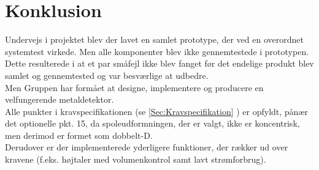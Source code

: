 \documentclass[../main.tex]{subfiles}
\begin{document}
\chapter{Konklusion} \label{Chap:Konklusion}
Undervejs i projektet blev der lavet en samlet prototype, der ved en overordnet systemtest virkede. Men alle komponenter blev ikke gennemtestede i prototypen. Dette resulterede i at et par småfejl ikke blev fanget før det endelige produkt blev samlet og gennemtested og var besværlige at udbedre.\\
Men Gruppen har formået at designe, implementere og producere en velfungerende metaldetektor.\\
Alle punkter i kravspecifikationen (se \ref{Sec:Kravspecifikation} ) er opfyldt, pånær det optionelle pkt. 15, da spoleudformningen, der er valgt, ikke er koncentrisk, men derimod er formet som dobbelt-D.\\
Derudover er der implementerede yderligere funktioner, der rækker ud over kravene (f.eks. højtaler med volumenkontrol samt  lavt strømforbrug).
\end{document}
